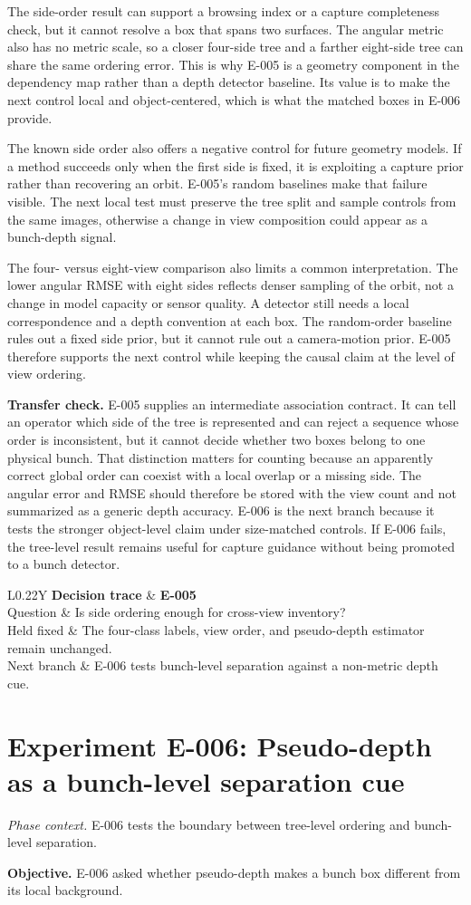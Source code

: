 \documentclass[preprint,12pt]{elsarticle}
\newcommand{\experiment}[2]{\par\medskip\Needspace{7\baselineskip}\section{Experiment #1: #2}}
\newcommand{\decisioncard}[4]{%
\begin{table}[H]\centering\small
\begin{tabularx}{\columnwidth}{L{0.22\columnwidth}Y}
\toprule
\textbf{Decision trace} & \textbf{#1}\\
Question & #2\\
Held fixed & #3\\
Next branch & #4\\
\bottomrule
\end{tabularx}
\end{table}}
\newcommand{\phasecontext}[1]{%
\par\smallskip\noindent\textit{Phase context.} #1\par\smallskip}
\begin{document}
The side-order result can support a browsing index or a capture completeness
check, but it cannot resolve a box that spans two surfaces. The angular metric
also has no metric scale, so a closer four-side tree and a farther eight-side
tree can share the same ordering error. This is why E-005 is a geometry
component in the dependency map rather than a depth detector baseline. Its
value is to make the next control local and object-centered, which is what the
matched boxes in E-006 provide.

The known side order also offers a negative control for future geometry models.
If a method succeeds only when the first side is fixed, it is exploiting a
capture prior rather than recovering an orbit. E-005's random baselines make
that failure visible. The next local test must preserve the tree split and
sample controls from the same images, otherwise a change in view composition
could appear as a bunch-depth signal.

The four- versus eight-view comparison also limits a common interpretation.
The lower angular RMSE with eight sides reflects denser sampling of the orbit,
not a change in model capacity or sensor quality. A detector still needs a
local correspondence and a depth convention at each box. The random-order
baseline rules out a fixed side prior, but it cannot rule out a camera-motion
prior. E-005 therefore supports the next control while keeping the causal
claim at the level of view ordering.

\textbf{Transfer check.} E-005 supplies an intermediate association contract.
It can tell an operator which side of the tree is represented and can reject a
sequence whose order is inconsistent, but it cannot decide whether two boxes
belong to one physical bunch. That distinction matters for counting because
an apparently correct global order can coexist with a local overlap or a
missing side. The angular error and RMSE should therefore be stored with the
view count and not summarized as a generic depth accuracy. E-006 is the next
branch because it tests the stronger object-level claim under size-matched
controls. If E-006 fails, the tree-level result remains useful for capture
guidance without being promoted to a bunch detector.

\decisioncard{E-005}{Is side ordering enough for cross-view inventory?}{The four-class labels, view order, and pseudo-depth estimator remain unchanged.}{E-006 tests bunch-level separation against a non-metric depth cue.}
\experiment{E-006}{Pseudo-depth as a bunch-level separation cue}
\phasecontext{E-006 tests the boundary between tree-level ordering and bunch-level separation.}
\textbf{Objective.} E-006 asked whether pseudo-depth makes a bunch box
different from its local background.
\end{document}
